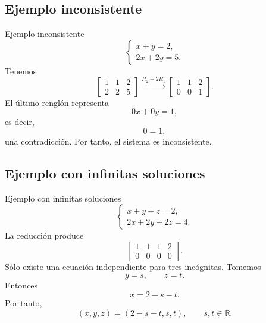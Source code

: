 \documentclass[aspectratio=169,11pt]{beamer}
\theoremstyle{remark}
\newcommand{\R}{\mathbb{R}}
\begin{document}
\subsection*{Ejemplo inconsistente}
\begin{frame}[allowframebreaks]{Ejemplo inconsistente}
\footnotesize
\[
\begin{cases}
x+y=2,\\
2x+2y=5.
\end{cases}
\]
Tenemos
\[
\left[
\begin{array}{cc|c}
1&1&2\\
2&2&5
\end{array}
\right]
\xrightarrow{R_2-2R_1}
\left[
\begin{array}{cc|c}
1&1&2\\
0&0&1
\end{array}
\right].
\]
El último renglón representa
\[
0x+0y=1,
\]
es decir,
\[
0=1,
\]
una contradicción. Por tanto, el sistema es inconsistente.
\end{frame}

\subsection*{Ejemplo con infinitas soluciones}
\begin{frame}[allowframebreaks]{Ejemplo con infinitas soluciones}
\footnotesize
\[
\begin{cases}
x+y+z=2,\\
2x+2y+2z=4.
\end{cases}
\]
La reducción produce
\[
\left[
\begin{array}{ccc|c}
1&1&1&2\\
0&0&0&0
\end{array}
\right].
\]
Sólo existe una ecuación independiente para tres incógnitas. Tomemos
\[
y=s,\qquad z=t.
\]
Entonces
\[
x=2-s-t.
\]
Por tanto,
\[
\boxed{(x,y,z)=(2-s-t,s,t),\qquad s,t\in\R.}
\]
\end{frame}
\end{document}

